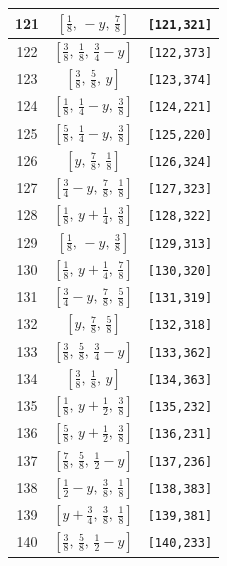 \documentclass[fleqn,8pt]{jsarticle}
\begin{document}
\begin{longtable}{ccc}
121 & $\left[ \frac{1}{8},\, - y,\, \frac{7}{8} \right]$ & {\tt [121,321]} \\ \hline
122 & $\left[ \frac{3}{8},\, \frac{1}{8},\, \frac{3}{4} - y \right]$ & {\tt [122,373]} \\ \hline
123 & $\left[ \frac{3}{8},\, \frac{5}{8},\, y \right]$ & {\tt [123,374]} \\ \hline
124 & $\left[ \frac{1}{8},\, \frac{1}{4} - y,\, \frac{3}{8} \right]$ & {\tt [124,221]} \\ \hline
125 & $\left[ \frac{5}{8},\, \frac{1}{4} - y,\, \frac{3}{8} \right]$ & {\tt [125,220]} \\ \hline
126 & $\left[ y,\, \frac{7}{8},\, \frac{1}{8} \right]$ & {\tt [126,324]} \\ \hline
127 & $\left[ \frac{3}{4} - y,\, \frac{7}{8},\, \frac{1}{8} \right]$ & {\tt [127,323]} \\ \hline
128 & $\left[ \frac{1}{8},\, y + \frac{1}{4},\, \frac{3}{8} \right]$ & {\tt [128,322]} \\ \hline
129 & $\left[ \frac{1}{8},\, - y,\, \frac{3}{8} \right]$ & {\tt [129,313]} \\ \hline
130 & $\left[ \frac{1}{8},\, y + \frac{1}{4},\, \frac{7}{8} \right]$ & {\tt [130,320]} \\ \hline
131 & $\left[ \frac{3}{4} - y,\, \frac{7}{8},\, \frac{5}{8} \right]$ & {\tt [131,319]} \\ \hline
132 & $\left[ y,\, \frac{7}{8},\, \frac{5}{8} \right]$ & {\tt [132,318]} \\ \hline
133 & $\left[ \frac{3}{8},\, \frac{5}{8},\, \frac{3}{4} - y \right]$ & {\tt [133,362]} \\ \hline
134 & $\left[ \frac{3}{8},\, \frac{1}{8},\, y \right]$ & {\tt [134,363]} \\ \hline
135 & $\left[ \frac{1}{8},\, y + \frac{1}{2},\, \frac{3}{8} \right]$ & {\tt [135,232]} \\ \hline
136 & $\left[ \frac{5}{8},\, y + \frac{1}{2},\, \frac{3}{8} \right]$ & {\tt [136,231]} \\ \hline
137 & $\left[ \frac{7}{8},\, \frac{5}{8},\, \frac{1}{2} - y \right]$ & {\tt [137,236]} \\ \hline
138 & $\left[ \frac{1}{2} - y,\, \frac{3}{8},\, \frac{1}{8} \right]$ & {\tt [138,383]} \\ \hline
139 & $\left[ y + \frac{3}{4},\, \frac{3}{8},\, \frac{1}{8} \right]$ & {\tt [139,381]} \\ \hline
140 & $\left[ \frac{3}{8},\, \frac{5}{8},\, \frac{1}{2} - y \right]$ & {\tt [140,233]} \\ \hline

\end{longtable}
\end{document}
